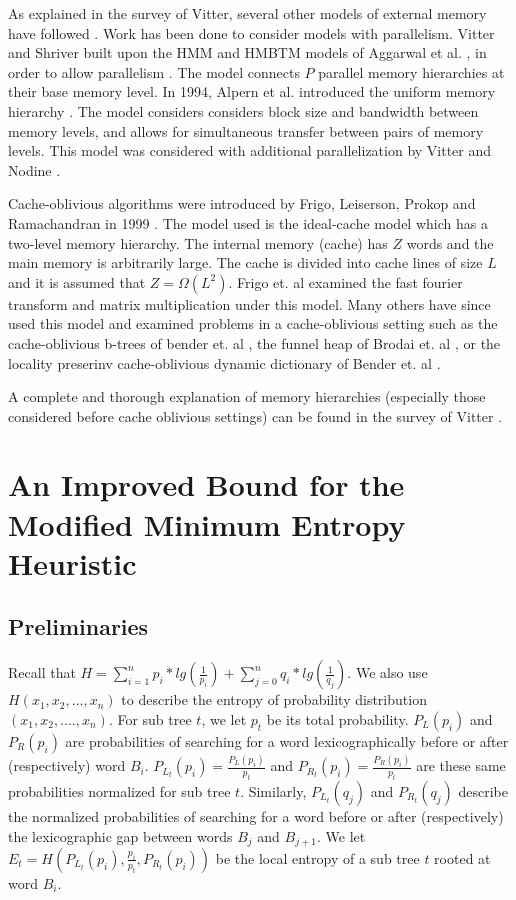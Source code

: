 \documentclass[letterpaper,12pt,titlepage,oneside,final]{book}
\theoremstyle{plain}
\begin{document}
As explained in the survey of Vitter, several other models of external memory have followed \cite{vitter2001external}. Work has been done to consider models with parallelism. Vitter and Shriver built upon the HMM and HMBTM models of Aggarwal et al. \cite{aggarwal1987model}, \cite{aggarwal1987hierarchical} in order to allow parallelism \cite{vitter1994algorithms}. The model connects $P$ parallel memory hierarchies at their base memory level. In 1994, Alpern et al. introduced the uniform memory hierarchy \cite{alpern1994uniform}. The model considers considers block size and bandwidth between memory levels, and allows for simultaneous transfer between pairs of memory levels. This model was considered with additional parallelization by Vitter and Nodine \cite{vitter1993large}.


Cache-oblivious algorithms were introduced by Frigo, Leiserson, Prokop and Ramachandran in 1999 \cite{frigo1999cache}. The model used is the ideal-cache model which has a two-level memory hierarchy. The internal memory (cache) has $Z$ words and the main memory is arbitrarily large. The cache is divided into cache lines of size $L$ and it is assumed that $Z=\Omega(L^2)$. Frigo et. al examined the fast fourier transform and matrix multiplication under this model. Many others have since used this model and examined problems in a cache-oblivious setting such as the cache-oblivious b-trees of bender et. al \cite{bender2000cache}, the funnel heap of Brodai et. al \cite{brodai2002funnel}, or the locality preserinv cache-oblivious dynamic dictionary of Bender et. al \cite{bender2002locality}.

A complete and thorough explanation of memory hierarchies (especially those considered before cache oblivious settings) can be found in the survey of Vitter \cite{vitter2001external}.



\chapter{An Improved Bound for the Modified Minimum Entropy Heuristic}\label{An Improved Bound for the Modified Minimum Entropy Heuristic}

\section{Preliminaries}

Recall that $H = \sum_{i=1}^{n} p_i*lg(\frac{1}{p_i}) + \sum_{j=0}^{n} q_i*lg(\frac{1}{q_j})$. We also use $H(x_1,x_2,...,x_n)$ to describe the entropy of probability distribution $(x_1, x_2, ...., x_n)$. For sub tree $t$, we let $p_t$ be its total probability. $P_{L}(p_i)$ and $P_{R}(p_i)$ are probabilities of searching for a word lexicographically before or after (respectively) word $B_i$. $P_{L_t}(p_i)=\frac{P_L(p_i)}{p_t}$ and $P_{R_t}(p_i)=\frac{P_R(p_i)}{p_t}$ are these same probabilities normalized for sub tree $t$. Similarly, $P_{L_t}(q_j)$ and $P_{R_t}(q_j)$ describe the normalized probabilities of searching for a word before or after (respectively) the lexicographic gap between words $B_j$ and $B_{j+1}$. We let $E_t=H(P_{L_t}(p_i), \frac{p_i}{p_t}, P_{R_t}(p_i))$ be the local entropy of a sub tree $t$ rooted at word $B_i$.  
\end{document}

